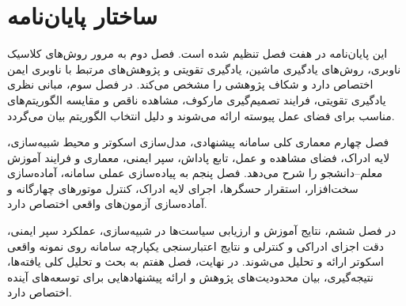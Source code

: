 \section{ساختار پایان‌نامه}

این پایان‌نامه در هفت فصل تنظیم شده است. فصل دوم به مرور روش‌های کلاسیک ناوبری، روش‌های یادگیری ماشین، یادگیری تقویتی و پژوهش‌های مرتبط با ناوبری ایمن اختصاص دارد و شکاف پژوهشی را مشخص می‌کند. در فصل سوم، مبانی نظری یادگیری تقویتی، فرایند تصمیم‌گیری مارکوف، مشاهده ناقص و مقایسه الگوریتم‌های مناسب برای فضای عمل پیوسته ارائه می‌شوند و دلیل انتخاب الگوریتم  بیان می‌گردد.

فصل چهارم معماری کلی سامانه پیشنهادی، مدل‌سازی اسکوتر و محیط شبیه‌سازی، لایه ادراک، فضای مشاهده و عمل، تابع پاداش، سپر ایمنی، معماری  و فرایند آموزش معلم--دانشجو را شرح می‌دهد. فصل پنجم به پیاده‌سازی عملی سامانه، آماده‌سازی سخت‌افزار، استقرار حسگرها، اجرای لایه ادراک، کنترل موتورهای چهارگانه و آماده‌سازی آزمون‌های واقعی اختصاص دارد.

در فصل ششم، نتایج آموزش و ارزیابی سیاست‌ها در شبیه‌سازی، عملکرد سپر ایمنی، دقت اجزای ادراکی و کنترلی و نتایج اعتبارسنجی یکپارچه سامانه روی نمونه واقعی اسکوتر ارائه و تحلیل می‌شوند. در نهایت، فصل هفتم به بحث و تحلیل کلی یافته‌ها، نتیجه‌گیری، بیان محدودیت‌های پژوهش و ارائه پیشنهادهایی برای توسعه‌های آینده اختصاص دارد.
